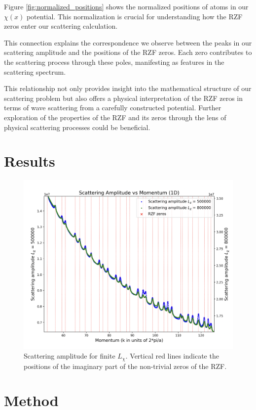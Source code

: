 \documentclass[11pt, oneside]{article}
\begin{document}
Figure \ref{fig:normalized_positions} shows the normalized positions of atoms in our $\chi(x)$ potential. This normalization is crucial for understanding how the RZF zeros enter our scattering calculation.

This connection explains the correspondence we observe between the peaks in our scattering amplitude and the positions of the RZF zeros. Each zero contributes to the scattering process through these poles, manifesting as features in the scattering spectrum.

This relationship not only provides insight into the mathematical structure of our scattering problem but also offers a physical interpretation of the RZF zeros in terms of wave scattering from a carefully constructed potential. Further exploration of the properties of the RZF and its zeros through the lens of physical scattering processes could be beneficial.

\section{Results}
\begin{figure}[htbp]
\begin{center}
    \includegraphics[width=0.8\linewidth]{../images/zoomed_scattering.png}
\caption{Scattering amplitude for finite $L_{\chi}$. Vertical red lines indicate the positions of the imaginary part of the non-trivial zeros of the RZF.}
\label{fig:scattering_amplitude}
\end{center}
\end{figure}

\section{Method}
\end{document}
